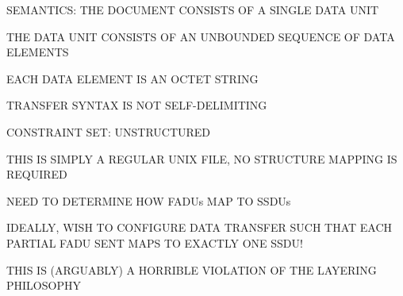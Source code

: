 \begin{bwslide}

\begin{nrtc}
\item	SEMANTICS: THE DOCUMENT CONSISTS OF A SINGLE DATA UNIT
    \begin{nrtc}
    \item	THE DATA UNIT CONSISTS OF AN UNBOUNDED SEQUENCE OF DATA
		ELEMENTS

    \item	EACH DATA ELEMENT IS AN OCTET STRING

    \item	TRANSFER SYNTAX IS NOT SELF-DELIMITING
    \end{nrtc}

\item	CONSTRAINT SET: UNSTRUCTURED

\item	THIS IS SIMPLY A REGULAR UNIX FILE, NO STRUCTURE MAPPING IS REQUIRED
\end{nrtc}
\end{bwslide}


\begin{bwslide}

\begin{nrtc}
\item	NEED TO DETERMINE HOW FADUs MAP TO SSDUs

\item	IDEALLY, WISH TO CONFIGURE DATA TRANSFER SUCH THAT EACH PARTIAL
	FADU SENT MAPS TO EXACTLY ONE SSDU!

\item	THIS IS (ARGUABLY) A HORRIBLE VIOLATION OF THE LAYERING PHILOSOPHY
\end{nrtc}
\end{bwslide}


